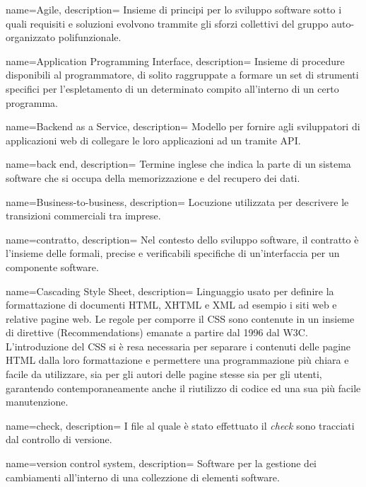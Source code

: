  {
name=Agile,
description={
Insieme di principi per lo sviluppo software sotto i quali requisiti e
soluzioni evolvono trammite gli sforzi collettivi del gruppo auto-organizzato
polifunzionale.
}
}

 {
name=Application Programming Interface,
description={
Insieme di procedure disponibili al programmatore, di solito raggruppate a
formare un set di strumenti specifici per l’espletamento di un determinato
compito all’interno di un certo programma.
}
}

 {
name=Backend as a Service,
description={
Modello per fornire agli sviluppatori di applicazioni web di collegare le loro
applicazioni ad un  tramite API.
}
}

 {
name=back end,
description={
Termine inglese che indica la parte di un sistema software che si occupa della
memorizzazione e del recupero dei dati.
}
}

 {
name=Business-to-business,
description={
Locuzione utilizzata per descrivere le transizioni commerciali tra imprese.
}
}

 {
name=contratto,
description={
Nel contesto dello sviluppo software, il contratto è l'insieme delle formali,
precise e verificabili specifiche di un'interfaccia per un componente software.
}
}

 {
name=Cascading Style Sheet,
description={
Linguaggio usato per definire la formattazione di documenti HTML, XHTML e
XML ad esempio i siti web e relative pagine web. Le regole per comporre il CSS
sono contenute in un insieme di direttive (Recommendations) emanate a partire
dal 1996 dal W3C. L’introduzione del CSS si è resa necessaria per separare i
contenuti delle pagine HTML dalla loro formattazione e permettere una
programmazione più chiara e facile da utilizzare, sia per gli autori delle
pagine stesse sia per gli utenti, garantendo contemporaneamente anche il
riutilizzo di codice ed una sua più facile manutenzione.
}
}

 {
name=check,
description={
I file al quale è stato effettuato il \textit{check} sono tracciati dal
controllo di versione.
}
}

 {
name=version control system,
description={
Software per la gestione dei cambiamenti all'interno di una collezzione di
elementi software.
}
}

